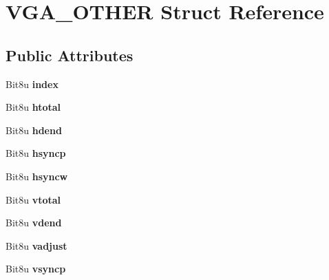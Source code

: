 \hypertarget{structVGA__OTHER}{\section{V\-G\-A\-\_\-\-O\-T\-H\-E\-R Struct Reference}
\label{structVGA__OTHER}
}
\subsection*{Public Attributes}
\begin{DoxyCompactItemize}
\item 
\hypertarget{structVGA__OTHER_af9906e66024f362beaaba1eaed462bb5}{Bit8u {\bfseries index}}\label{structVGA__OTHER_af9906e66024f362beaaba1eaed462bb5}

\item 
\hypertarget{structVGA__OTHER_a2c5100721208e43369c6376d3077346a}{Bit8u {\bfseries htotal}}\label{structVGA__OTHER_a2c5100721208e43369c6376d3077346a}

\item 
\hypertarget{structVGA__OTHER_a2991d5ca277ea72d1a871bc8d5e8f4df}{Bit8u {\bfseries hdend}}\label{structVGA__OTHER_a2991d5ca277ea72d1a871bc8d5e8f4df}

\item 
\hypertarget{structVGA__OTHER_a1a9ce6847a066667209331b850c8f695}{Bit8u {\bfseries hsyncp}}\label{structVGA__OTHER_a1a9ce6847a066667209331b850c8f695}

\item 
\hypertarget{structVGA__OTHER_a2fdf50ad356b6ac8e421d7cd13c5a040}{Bit8u {\bfseries hsyncw}}\label{structVGA__OTHER_a2fdf50ad356b6ac8e421d7cd13c5a040}

\item 
\hypertarget{structVGA__OTHER_a29a099d2a253df8f8d9df3d303066578}{Bit8u {\bfseries vtotal}}\label{structVGA__OTHER_a29a099d2a253df8f8d9df3d303066578}

\item 
\hypertarget{structVGA__OTHER_afc1a703b90bbe1a5b93dda37e2322a96}{Bit8u {\bfseries vdend}}\label{structVGA__OTHER_afc1a703b90bbe1a5b93dda37e2322a96}

\item 
\hypertarget{structVGA__OTHER_a7ebb8dc7b7d001b034e5cf3c2dcbf2a1}{Bit8u {\bfseries vadjust}}\label{structVGA__OTHER_a7ebb8dc7b7d001b034e5cf3c2dcbf2a1}

\item 
\hypertarget{structVGA__OTHER_a854a0e3d2189bb8860f7a1dd01f7575c}{Bit8u {\bfseries vsyncp}}\label{structVGA__OTHER_a854a0e3d2189bb8860f7a1dd01f7575c}


\end{DoxyCompactItemize}

